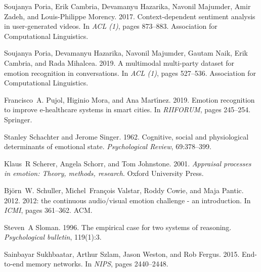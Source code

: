 \documentclass[11pt,a4paper]{article}
\begin{document}
\begin{thebibliography}{45}
  Soujanya Poria, Erik Cambria, Devamanyu Hazarika, Navonil Majumder, Amir Zadeh,
    and Louis{-}Philippe Morency. 2017.
  \newblock Context-dependent sentiment analysis in user-generated videos.
  \newblock In \emph{{ACL} {(1)}}, pages 873--883. Association for Computational
    Linguistics.
  
  Soujanya Poria, Devamanyu Hazarika, Navonil Majumder, Gautam Naik, Erik
    Cambria, and Rada Mihalcea. 2019.
   {A} multimodal multi-party dataset for emotion recognition in
    conversations.
  \newblock In \emph{{ACL} {(1)}}, pages 527--536. Association for Computational
    Linguistics.
  
  Francisco~A. Pujol, Higinio Mora, and Ana Mart{\'{\i}}nez. 2019.
  \newblock Emotion recognition to improve e-healthcare systems in smart cities.
  \newblock In \emph{{RIIFORUM}}, pages 245--254. Springer.
  
  Stanley Schachter and Jerome Singer. 1962.
  \newblock Cognitive, social and physiological determinants of emotional state.
  \newblock \emph{Psychological Review}, 69:378--399.
  
  Klaus~R Scherer, Angela Schorr, and Tom Johnstone. 2001.
  \newblock \emph{Appraisal processes in emotion: Theory, methods, research}.
  \newblock Oxford University Press.
  
  Bj{\"{o}}rn~W. Schuller, Michel~Fran{\c{c}}ois Valstar, Roddy Cowie, and Maja
    Pantic. 2012.
   2012: the continuous audio/visual emotion challenge - an
    introduction.
  \newblock In \emph{{ICMI}}, pages 361--362. {ACM}.
  
  Steven~A Sloman. 1996.
  \newblock The empirical case for two systems of reasoning.
  \newblock \emph{Psychological bulletin}, 119(1):3.
  
  Sainbayar Sukhbaatar, Arthur Szlam, Jason Weston, and Rob Fergus. 2015.
  \newblock End-to-end memory networks.
  \newblock In \emph{{NIPS}}, pages 2440--2448.
  

\end{thebibliography}
\end{document}
